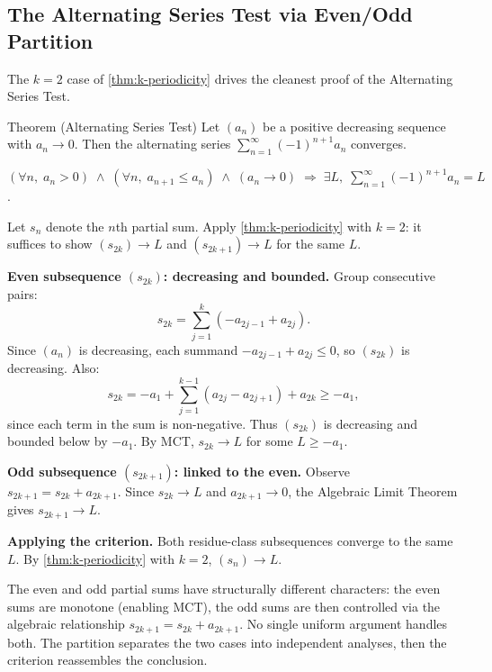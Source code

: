 \subsection*{The Alternating Series Test via Even/Odd Partition}
\label{subsec:ast-even-odd}

The $k = 2$ case of \cref{thm:k-periodicity} drives the cleanest proof
of the Alternating Series Test.

\begin{theorembox}{Theorem (Alternating Series Test)}
\label{thm:alternating-series-test}
Let $(a_n)$ be a positive decreasing sequence with $a_n \to 0$. Then the
alternating series $\sum_{n=1}^{\infty} (-1)^{n+1} a_n$ converges.
\end{theorembox}

\begin{remark}
$(\forall n,\;a_n > 0)\;\land\;(\forall n,\;a_{n+1} \leq a_n)\;\land\;
(a_n \to 0) \;\Rightarrow\; \exists L,\;\sum_{n=1}^\infty (-1)^{n+1} a_n = L$.
\end{remark}

\begin{remark}
Let $s_n$ denote the $n$th partial sum. Apply \cref{thm:k-periodicity}
with $k = 2$: it suffices to show $(s_{2k}) \to L$ and $(s_{2k+1}) \to L$
for the same $L$.

\medskip
\noindent\textbf{Even subsequence $(s_{2k})$: decreasing and bounded.}
Group consecutive pairs:
\[
  s_{2k} = \sum_{j=1}^{k} (-a_{2j-1} + a_{2j}).
\]
Since $(a_n)$ is decreasing, each summand $-a_{2j-1} + a_{2j} \leq 0$,
so $(s_{2k})$ is decreasing. Also:
\[
  s_{2k} = -a_1 + \sum_{j=1}^{k-1}(a_{2j} - a_{2j+1}) + a_{2k} \geq -a_1,
\]
since each term in the sum is non-negative. Thus $(s_{2k})$ is decreasing
and bounded below by $-a_1$. By MCT, $s_{2k} \to L$ for some $L \geq -a_1$.

\medskip
\noindent\textbf{Odd subsequence $(s_{2k+1})$: linked to the even.}
Observe $s_{2k+1} = s_{2k} + a_{2k+1}$. Since $s_{2k} \to L$ and
$a_{2k+1} \to 0$, the Algebraic Limit Theorem gives $s_{2k+1} \to L$.

\medskip
\noindent\textbf{Applying the criterion.}
Both residue-class subsequences converge to the same $L$. By
\cref{thm:k-periodicity} with $k = 2$, $(s_n) \to L$.
\end{remark}

\begin{remark}
The even and odd partial sums have structurally different characters:
the even sums are monotone (enabling MCT), the odd sums are then
controlled via the algebraic relationship $s_{2k+1} = s_{2k} + a_{2k+1}$.
No single uniform argument handles both. The partition separates the two
cases into independent analyses, then the criterion reassembles the
conclusion.
\end{remark}

